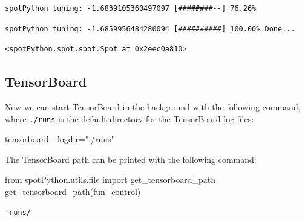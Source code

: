 \documentclass[
  letterpaper,
  DIV=11,
  numbers=noendperiod]{scrreprt}
\newenvironment{Shaded}{\begin{snugshade}}{\end{snugshade}}
\newcommand{\BuiltInTok}[1]{\textcolor[rgb]{0.00,0.23,0.31}{#1}}
\newcommand{\ImportTok}[1]{\textcolor[rgb]{0.00,0.46,0.62}{#1}}
\newcommand{\NormalTok}[1]{\textcolor[rgb]{0.00,0.23,0.31}{#1}}
\begin{document}
\begin{verbatim}
spotPython tuning: -1.6839105360497097 [########--] 76.26% 
\end{verbatim}

\begin{verbatim}
spotPython tuning: -1.6859956484280094 [##########] 100.00% Done...
\end{verbatim}

\begin{verbatim}
<spotPython.spot.spot.Spot at 0x2eec0a810>
\end{verbatim}

\hypertarget{sec-tensorboard-10}{%
\subsection{TensorBoard}\label{sec-tensorboard-10}}

Now we can start TensorBoard in the background with the following
command, where \texttt{./runs} is the default directory for the
TensorBoard log files:

\begin{Shaded}
\begin{Highlighting}[]
\NormalTok{tensorboard {-}{-}logdir="./runs"}
\end{Highlighting}
\end{Shaded}

\begin{tcolorbox}[enhanced jigsaw, left=2mm, toprule=.15mm, colframe=quarto-callout-tip-color-frame, leftrule=.75mm, title=\textcolor{quarto-callout-tip-color}{\faLightbulb}\hspace{0.5em}{Tip: TENSORBOARD\_PATH}, toptitle=1mm, opacitybacktitle=0.6, arc=.35mm, titlerule=0mm, opacityback=0, bottomtitle=1mm, coltitle=black, rightrule=.15mm, colback=white, colbacktitle=quarto-callout-tip-color!10!white, breakable, bottomrule=.15mm]

The TensorBoard path can be printed with the following command:

\begin{Shaded}
\begin{Highlighting}[]
\ImportTok{from}\NormalTok{ spotPython.utils.}\BuiltInTok{file} \ImportTok{import}\NormalTok{ get\_tensorboard\_path}
\NormalTok{get\_tensorboard\_path(fun\_control)}
\end{Highlighting}
\end{Shaded}

\begin{verbatim}
'runs/'
\end{verbatim}

\end{tcolorbox}
\end{document}
